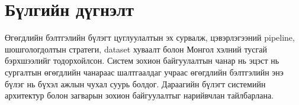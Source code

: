 \section{Бүлгийн дүгнэлт}

Өгөгдлийн бэлтгэлийн бүлэгт цуглуулалтын эх сурвалж, цэвэрлэгээний pipeline,
шошгологдолтын стратеги, dataset хуваалт болон Монгол хэлний тусгай бэрхшээлийг
тодорхойлсон. Систем зохион байгуулалтын чанар нь эцэст нь сургалтын өгөгдлийн
чанараас шалтгаалдаг учраас өгөгдлийн бэлтгэлийн энэ бүлэг нь бүхэл ажлын
чухал суурь болдог. Дараагийн бүлэгт системийн архитектур болон загварын зохион
байгуулалтыг нарийвчлан тайлбарлана.
